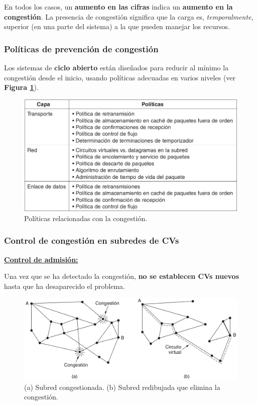 \documentclass[10pt,a4paper]{article}
\begin{document}
En todos los casos, un \textbf{aumento en las cifras} indica un \textbf{aumento en la congestión}. La presencia de congestión significa que la carga es, \textit{temporalmente}, superior (en una parte del sistema) a la que pueden manejar los recursos.

\subsubsection{Políticas de prevención de congestión}

Los sistemas de \textbf{ciclo abierto} están diseñados para reducir al mínimo la congestión desde el inicio, usando políticas adecuadas en varios niveles (ver \textbf{Figura \ref{fig:politicas_cicloabierto}}).

\begin{figure}[ht!]
  \caption{Políticas relacionadas con la congestión.}  
  \label{fig:politicas_cicloabierto}
  \centerline{\includegraphics[width=0.8\textwidth-\fboxrule-\fboxrule]{imgs/politicas_cicloabierto.png}}
\end{figure}

\subsubsection{Control de congestión en subredes de CVs}

\underline{\textbf{Control de admisión:}}

Una vez que se ha detectado la congestión, \textbf{no se establecen CVs nuevos} hasta que ha desaparecido el problema.

\begin{figure}
  \caption{(a) Subred congestionada. (b) Subred redibujada que elimina la congestión.}
  \label{fig:control_admision}  
  \centering
  \hbox{\includegraphics[width=0.7\textwidth-\fboxrule-\fboxrule]{imgs/control_admision.png}}  
\end{figure}
\end{document}
